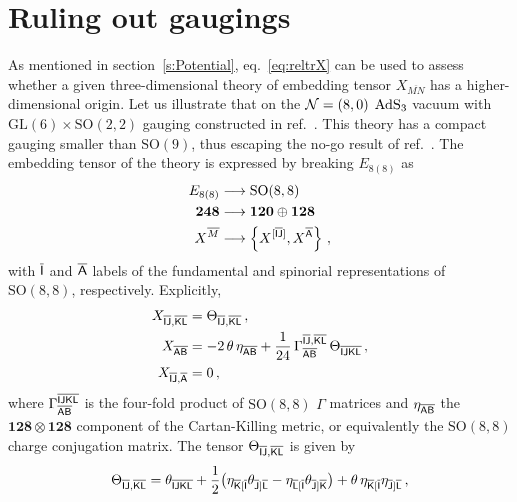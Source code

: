 \documentclass[a4paper, 11pt]{article}
\numberwithin{equation}{section}
\newcommand{\ov}[1]{\overline{#1}}
\newcommand{\GL}[1]{\mathrm{GL}( #1 )}
\newcommand{\SO}[1]{\mathrm{SO}( #1 )}
\newcommand{\EE}{\ensuremath{E_{8(8)}}\xspace}
\newcommand{\+}{\oplus}
\newcommand{\fl}[1]{\ov{#1}}
\begin{document}
\appendix

\section{Ruling out gaugings} \label{app:rulingoutgauging}
As mentioned in section~\ref{s:Potential}, eq.~\eqref{eq:reltrX} can be used to assess whether a given three-dimensional theory of embedding tensor $X_{\fl{MN}}$ has a higher-dimensional origin. Let us illustrate that on the ${\cal N}=(8,0)$ ${\rm AdS}_{3}$ vacuum with $\GL{6} \times \SO{2,2}$ gauging constructed in ref.~\cite{Deger:2019tem}. This theory has a compact gauging smaller than $\SO{9}$, thus escaping the no-go result of ref.~\cite{Galli:2022idq}. The embedding tensor of the theory is expressed by breaking $\EE$ as
\begin{equation}
	\begin{aligned}
		\EE &\longrightarrow \SO{8,8}\\
		\mathbf{248} &\longrightarrow \mathbf{120} \oplus \mathbf{128}\\
		X^{\fl{M}} &\longrightarrow \left\{X^{[\fl{\sf IJ}]},X^{\fl{\sf A}}\right\}\,,
	\end{aligned}
\end{equation}
with $\fl{\sf I}$ and $\fl{\sf A}$ labels of the fundamental and spinorial representations of $\SO{8,8}$, respectively. Explicitly,
\begin{equation}
	\begin{aligned}
		X_{\fl{\sf IJ},\fl{\sf KL}} &= \Theta_{\fl{\sf IJ},\fl{\sf KL}}\,,\\
		X_{\fl{\sf AB}} &= -2\,\theta\,\eta_{\fl{\sf AB}}+\frac{1}{24}\,\Gamma^{\fl{\sf IJ},\fl{\sf KL}}_{\fl{\sf AB}}\,\Theta_{\fl{\sf IJKL}}\,,\\
		X_{\fl{\sf IJ},\fl{\sf A}} &=0\,,
	\end{aligned}
\end{equation}
where $\Gamma^{\fl{\sf IJKL}}_{\fl{\sf AB}}$ is the four-fold product of $\SO{8,8}$ $\Gamma$ matrices and $\eta_{\fl{\sf AB}}$ the $\mathbf{128}\otimes\mathbf{128}$ component of the Cartan-Killing metric, or equivalently the $\SO{8,8}$ charge conjugation matrix. The tensor $\Theta_{\fl{\sf IJ},\fl{\sf KL}}$ is given by
\begin{equation}
	\Theta_{\fl{\sf IJ},\fl{\sf KL}}=\theta_{\fl{\sf IJKL}}+\frac12\big(\eta_{\fl{\sf K}[\fl{\sf I}}\theta_{\fl{\sf J}]\fl{\sf L}}-\eta_{\fl{\sf L}[\fl{\sf I}}\theta_{\fl{\sf J}]\fl{\sf K}}\big)+\theta\,\eta_{\fl{\sf K}[\fl{\sf I}}\eta_{\fl{\sf J}]\fl{\sf L}}\,,
\end{equation}
\end{document}
